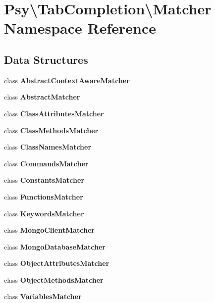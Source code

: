 \section{Psy\textbackslash{}Tab\+Completion\textbackslash{}Matcher Namespace Reference}
\label{namespace_psy_1_1_tab_completion_1_1_matcher}
\subsection*{Data Structures}
\begin{DoxyCompactItemize}
\item 
class {\bf Abstract\+Context\+Aware\+Matcher}
\item 
class {\bf Abstract\+Matcher}
\item 
class {\bf Class\+Attributes\+Matcher}
\item 
class {\bf Class\+Methods\+Matcher}
\item 
class {\bf Class\+Names\+Matcher}
\item 
class {\bf Commands\+Matcher}
\item 
class {\bf Constants\+Matcher}
\item 
class {\bf Functions\+Matcher}
\item 
class {\bf Keywords\+Matcher}
\item 
class {\bf Mongo\+Client\+Matcher}
\item 
class {\bf Mongo\+Database\+Matcher}
\item 
class {\bf Object\+Attributes\+Matcher}
\item 
class {\bf Object\+Methods\+Matcher}
\item 
class {\bf Variables\+Matcher}
\end{DoxyCompactItemize}
